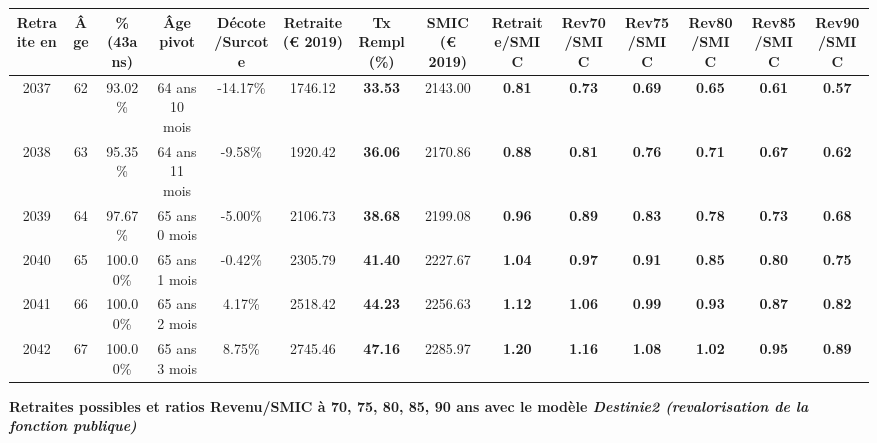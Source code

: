 \begin{adjustbox}{max width=\textwidth} 
\begin{tabular}[htb]{|c|c||c|c|c||c|c||c||c|c|c|c|c|c|} 
\hline 
 Retraite en &  Âge &  \%(43ans) &  Âge pivot &  Décote/Surcote &  Retraite (\euro{} 2019) &  Tx Rempl(\%) &  SMIC (\euro{} 2019) &  Retraite/SMIC &  Rev70/SMIC &  Rev75/SMIC &  Rev80/SMIC &  Rev85/SMIC &  Rev90/SMIC \\ 
\hline \hline 
 2037 &  62 &  93.02\% &  64 ans 10 mois &  -14.17\% &  1746.12 &  {\bf 33.53} &  2143.00 &  {\bf {\color{red} 0.81}} &  {\bf {\color{red} 0.73}} &  {\bf {\color{red} 0.69}} &  {\bf {\color{red} 0.65}} &  {\bf {\color{red} 0.61}} &  {\bf {\color{red} 0.57}} \\ 
\hline 
 2038 &  63 &  95.35\% &  64 ans 11 mois &  -9.58\% &  1920.42 &  {\bf 36.06} &  2170.86 &  {\bf {\color{red} 0.88}} &  {\bf {\color{red} 0.81}} &  {\bf {\color{red} 0.76}} &  {\bf {\color{red} 0.71}} &  {\bf {\color{red} 0.67}} &  {\bf {\color{red} 0.62}} \\ 
\hline 
 2039 &  64 &  97.67\% &  65 ans 0 mois &  -5.00\% &  2106.73 &  {\bf 38.68} &  2199.08 &  {\bf {\color{red} 0.96}} &  {\bf {\color{red} 0.89}} &  {\bf {\color{red} 0.83}} &  {\bf {\color{red} 0.78}} &  {\bf {\color{red} 0.73}} &  {\bf {\color{red} 0.68}} \\ 
\hline 
 2040 &  65 &  100.00\% &  65 ans 1 mois &  -0.42\% &  2305.79 &  {\bf 41.40} &  2227.67 &  {\bf 1.04} &  {\bf {\color{red} 0.97}} &  {\bf {\color{red} 0.91}} &  {\bf {\color{red} 0.85}} &  {\bf {\color{red} 0.80}} &  {\bf {\color{red} 0.75}} \\ 
\hline 
 2041 &  66 &  100.00\% &  65 ans 2 mois &  4.17\% &  2518.42 &  {\bf 44.23} &  2256.63 &  {\bf 1.12} &  {\bf 1.06} &  {\bf {\color{red} 0.99}} &  {\bf {\color{red} 0.93}} &  {\bf {\color{red} 0.87}} &  {\bf {\color{red} 0.82}} \\ 
\hline 
 2042 &  67 &  100.00\% &  65 ans 3 mois &  8.75\% &  2745.46 &  {\bf 47.16} &  2285.97 &  {\bf 1.20} &  {\bf 1.16} &  {\bf 1.08} &  {\bf 1.02} &  {\bf {\color{red} 0.95}} &  {\bf {\color{red} 0.89}} \\ 
\hline 
\hline 
\end{tabular} 
\end{adjustbox} 
 
 \vspace{0.1cm} 
{\bf \noindent Retraites possibles et ratios Revenu/SMIC à 70, 75, 80, 85, 90 ans avec le modèle \emph{Destinie2 (revalorisation de la fonction publique)}}  
 
